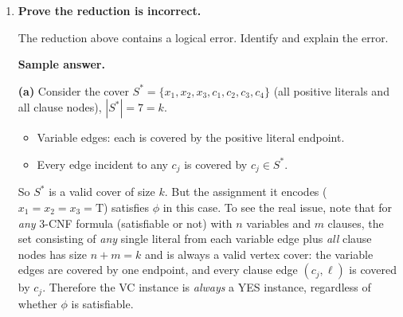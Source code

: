 \documentclass[11pt]{article}
\begin{document}
\begin{enumerate}[leftmargin=0pt, itemindent=1.7em, itemsep=1.2em]
\medskip
\noindent
\textbf{(b)} Take $S = \{x_1,\,\bar{x}_2,\,x_3,\,c_1,\,c_2,\,c_3,\,c_4\}$. Then $|S| = 7 = k$.
\begin{itemize}
  \item Variable edges: $(x_1,\bar x_1)$ covered by $x_1$; $(x_2,\bar x_2)$ covered by $\bar x_2$; $(x_3,\bar x_3)$ covered by $x_3$.
  \item All edges incident to $c_j$ are covered because $c_j \in S$.
\end{itemize}
Every edge is covered, so $S$ is a valid vertex cover of size $k=7$.
\fi

\item \textbf{Prove the reduction is incorrect.}

The reduction above contains a logical error. Identify and explain the error.




\vspace{7.0cm}

\ifanswers
\textbf{Sample answer.}

\medskip
\noindent
\textbf{(a)} Consider the cover $S^* = \{x_1, x_2, x_3, c_1, c_2, c_3, c_4\}$ (all positive literals and all clause nodes), $|S^*| = 7 = k$.
\begin{itemize}
  \item Variable edges: each is covered by the positive literal endpoint.
  \item Every edge incident to any $c_j$ is covered by $c_j \in S^*$.
\end{itemize}
So $S^*$ is a valid cover of size $k$. But the assignment it encodes ($x_1=x_2=x_3=\mathrm{T}$) satisfies $\phi$ in this case. To see the real issue, note that for \emph{any} 3-CNF formula (satisfiable or not) with $n$ variables and $m$ clauses, the set consisting of \emph{any} single literal from each variable edge plus \emph{all} clause nodes has size $n + m = k$ and is always a valid vertex cover: the variable edges are covered by one endpoint, and every clause edge $(c_j, \ell)$ is covered by $c_j$. Therefore the VC instance is \emph{always} a YES instance, regardless of whether $\phi$ is satisfiable.


\end{enumerate}
\end{document}
